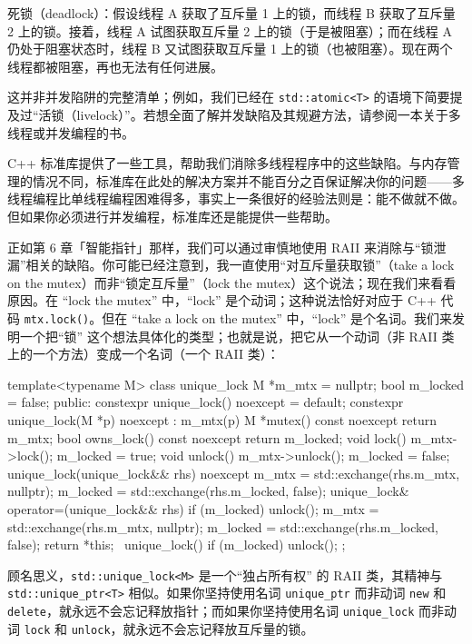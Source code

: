 死锁（deadlock）：假设线程 A 获取了互斥量 1 上的锁，而线程 B 获取了互斥量 2 上的锁。接着，线程 A 试图获取互斥量 2 上的锁（于是被阻塞）；而在线程 A 仍处于阻塞状态时，线程 B 又试图获取互斥量 1 上的锁（也被阻塞）。现在两个线程都被阻塞，再也无法有任何进展。

这并非并发陷阱的完整清单；例如，我们已经在 \texttt{std::\allowbreak{}atomic<\allowbreak{}T>\allowbreak{}} 的语境下简要提及过“活锁（livelock）”。若想全面了解并发缺陷及其规避方法，请参阅一本关于多线程或并发编程的书。

C++ 标准库提供了一些工具，帮助我们消除多线程程序中的这些缺陷。与内存管理的情况不同，标准库在此处的解决方案并不能百分之百保证解决你的问题——多线程编程比单线程编程困难得多，事实上一条很好的经验法则是：能不做就不做。但如果你必须进行并发编程，标准库还是能提供一些帮助。

正如第 6 章「智能指针」那样，我们可以通过审慎地使用 RAII 来消除与“锁泄漏”相关的缺陷。你可能已经注意到，我一直使用“对互斥量获取锁”（take a lock on the mutex）而非“锁定互斥量”（lock the mutex）这个说法；现在我们来看看原因。在 “lock the mutex” 中，“lock” 是个动词；这种说法恰好对应于 C++ 代码 \texttt{mtx.\allowbreak{}lock(\allowbreak{})\allowbreak{}}。但在 “take a lock on the mutex” 中，“lock” 是个名词。我们来发明一个把“锁” 这个想法具体化的类型；也就是说，把它从一个动词（非 RAII 类上的一个方法）变成一个名词（一个 RAII 类）：

\begin{codebox}[cpp]
    template<typename M>
    class unique_lock {
      M *m_mtx = nullptr;
      bool m_locked = false;
    public:
      constexpr unique_lock() noexcept = default;
      constexpr unique_lock(M *p) noexcept : m_mtx(p) {}
      M *mutex() const noexcept { return m_mtx; }
      bool owns_lock() const noexcept { return m_locked; }
      void lock() { m_mtx->lock(); m_locked = true; }
      void unlock() { m_mtx->unlock(); m_locked = false; }
      unique_lock(unique_lock&& rhs) noexcept {
        m_mtx = std::exchange(rhs.m_mtx, nullptr);
        m_locked = std::exchange(rhs.m_locked, false);
      }
      unique_lock& operator=(unique_lock&& rhs) {
        if (m_locked) {
            unlock();
        }
        m_mtx = std::exchange(rhs.m_mtx, nullptr);
        m_locked = std::exchange(rhs.m_locked, false);
        return *this;
      }
      ~unique_lock() {
        if (m_locked) {
            unlock();
        }
      }
    };
\end{codebox}

顾名思义，\texttt{std::\allowbreak{}unique\_\allowbreak{}lock<\allowbreak{}M>\allowbreak{}} 是一个“独占所有权” 的 RAII 类，其精神与 \texttt{std::\allowbreak{}unique\_\allowbreak{}ptr<\allowbreak{}T>\allowbreak{}} 相似。如果你坚持使用名词 \texttt{unique\_\allowbreak{}ptr} 而非动词 \texttt{new} 和 \texttt{delete}，就永远不会忘记释放指针；而如果你坚持使用名词 \texttt{unique\_\allowbreak{}lock} 而非动词 \texttt{lock} 和 \texttt{unlock}，就永远不会忘记释放互斥量的锁。

